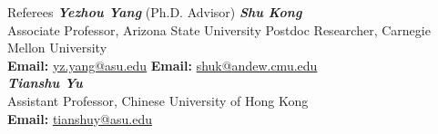 \documentclass{resume} %
\begin{document}
\begin{rSection}{Referees}
\textbf{\textit{Yezhou Yang}} (Ph.D. Advisor) \hspace{27mm} {\textbf{\textit{Shu Kong}}}\\
Associate Professor, Arizona State University \hfill  Postdoc Researcher, Carnegie Mellon University\\
\textbf{Email: }\url{yz.yang@asu.edu} \hspace{36.7mm} \textbf{Email: } \url{shuk@andew.cmu.edu} \\

\textbf{\textit{Tianshu Yu}} \\
Assistant Professor, Chinese University of Hong Kong \\
\textbf{Email: }\url{tianshuy@asu.edu} 

\end{rSection}
\end{document}
